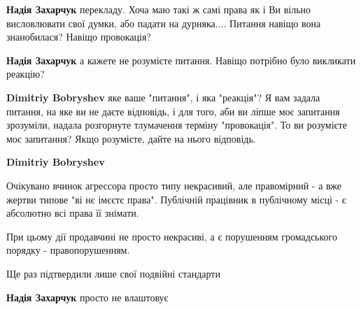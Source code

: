 \begin{itemize}
\begin{itemize}
\textbf{Надія Захарчук} перекладу. Хоча маю такі ж самі права як і Ви вільно висловлювати свої думки, або падати на дурняка....
Питання навіщо вона знанобилася? Навіщо провокація?

 
\textbf{Надія Захарчук} а кажете не розумієте питання. Навіщо потрібно було викликати реакцію?

 
\textbf{Dimitriy Bobryshev} яке ваше "питання", і яка "реакція"? Я вам задала питання, на яке ви не даєте відповідь, і для того, аби ви ліпше моє запитання зрозуміли, надала розгорнуте тлумачення терміну "провокація". То ви розумієте моє запитання? Якщо розумієте, дайте на нього відповідь.

 
\textbf{Dimitriy Bobryshev}

Очікувано вчинок агрессора просто типу некрасивий, але правомірний - а вже
жертви типове "ві нє імєєтє права". Публічній працівник в публічному місці - є
абсолютно всі права її знімати.

При цьому дії продавчині не просто некрасиві, а є порушенням громадського
порядку - правопорушенням.

Ще раз підтвердили лише свої подвійні стандарти

 
\textbf{Надія Захарчук} просто не влаштовує

 

\end{itemize}
\end{itemize}
